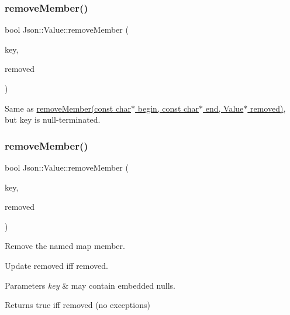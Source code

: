 \subsubsection{\texorpdfstring{remove\+Member()}{removeMember()}\hspace{0.1cm}{\footnotesize\ttfamily [3/4]}}
{\footnotesize\ttfamily bool Json\+::\+Value\+::remove\+Member (\begin{DoxyParamCaption}\item[{const char $\ast$}]{key,  }\item[{\hyperlink{classJson_1_1Value}{Value} $\ast$}]{removed }\end{DoxyParamCaption})}

Same as \hyperlink{classJson_1_1Value_a49c91af727d6b4eb0af02a81bb2def87}{remove\+Member(const char$\ast$ begin, const char$\ast$ end, Value$\ast$ removed)}, but \textquotesingle{}key\textquotesingle{} is null-\/terminated. \mbox{\label{classJson_1_1Value_ae385ecef98427970df525ee876e9f54a}} 
\subsubsection{\texorpdfstring{remove\+Member()}{removeMember()}\hspace{0.1cm}{\footnotesize\ttfamily [4/4]}}
{\footnotesize\ttfamily bool Json\+::\+Value\+::remove\+Member (\begin{DoxyParamCaption}\item[{J\+S\+O\+N\+C\+P\+P\+\_\+\+S\+T\+R\+I\+NG const \&}]{key,  }\item[{\hyperlink{classJson_1_1Value}{Value} $\ast$}]{removed }\end{DoxyParamCaption})}



Remove the named map member. 

Update \textquotesingle{}removed\textquotesingle{} iff removed. 
\begin{DoxyParams}{Parameters}
{\em key} & may contain embedded nulls. \\
\hline
\end{DoxyParams}
\begin{DoxyReturn}{Returns}
true iff removed (no exceptions) 
\end{DoxyReturn}
\mbox{\label{classJson_1_1Value_aa284353271ada427dbfa04a42f2be407}} 
